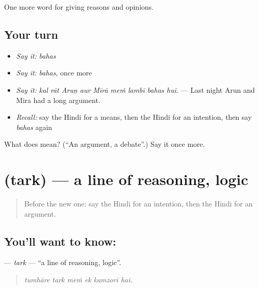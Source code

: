 \begin{grammarlens}[title={What you've built}]
One more word for giving reasons and opinions.
\end{grammarlens}

\subsection*{Your turn}
\begin{itemize}
\raggedright
  \item \emph{Say it:} \emph{bahas}
  \item \emph{Say it:} \emph{bahas}, once more
  \item \emph{Say it:} \emph{kal rāt Aruṇ aur Mīrā meṁ lambī bahas huī.} — Last night Arun and Mira had a long argument.
  \item \emph{Recall:} say the Hindi for a means, then the Hindi for an intention, then say \emph{bahas} again
\end{itemize}

\begin{tcolorbox}[breakable,colback=teal!4,colframe=teal!35!black,title={Before you move on}]
What does  mean? (\textquotedblleft{}An argument, a debate\textquotedblright{}.) Say it once more.
\end{tcolorbox}
\section[\texorpdfstring{\hi{तर्क} (tark)}{तर्क (tark)}]{ (tark) — a line of reasoning, logic}

\label{lesson:HI-C346-tark}



\begin{quote}
Before the new one: say the Hindi for an intention, then the Hindi for an argument.
\end{quote}

\subsection*{You'll want to know: }
\textbf{} — \emph{tark} — \textquotedblleft{}a line of reasoning, logic\textquotedblright{}.

\begin{quote}
     
\end{quote}

\begin{quote}
\emph{tumhāre tark meṁ ek kamzorī hai.}
\end{quote}

